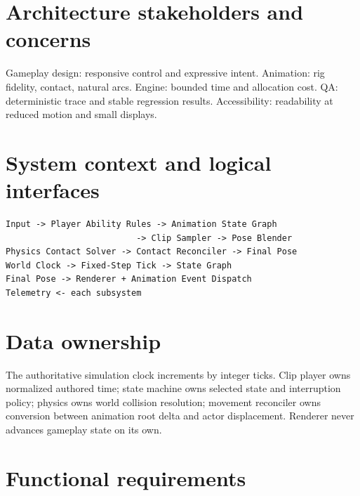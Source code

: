 \documentclass[10pt,letterpaper]{article}
\begin{document}
\makedoctitle
\makedocsummary
\tableofcontents\clearpage

\section{Architecture stakeholders and concerns}
Gameplay design: responsive control and expressive intent. Animation: rig fidelity, contact, natural arcs. Engine: bounded time and allocation cost. QA: deterministic trace and stable regression results. Accessibility: readability at reduced motion and small displays.
\section{System context and logical interfaces}
\begin{verbatim}
Input -> Player Ability Rules -> Animation State Graph
                          -> Clip Sampler -> Pose Blender
Physics Contact Solver -> Contact Reconciler -> Final Pose
World Clock -> Fixed-Step Tick -> State Graph
Final Pose -> Renderer + Animation Event Dispatch
Telemetry <- each subsystem
\end{verbatim}
\section{Data ownership}
The authoritative simulation clock increments by integer ticks. Clip player owns normalized authored time; state machine owns selected state and interruption policy; physics owns world collision resolution; movement reconciler owns conversion between animation root delta and actor displacement. Renderer never advances gameplay state on its own.
\section{Functional requirements}
\end{document}
